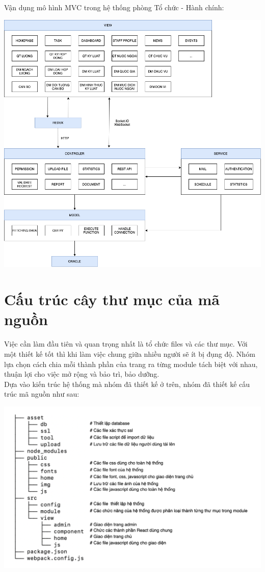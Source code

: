 Vận dụng mô hình MVC trong hệ thống phòng Tổ chức - Hành chính:
\begin{center}
  \captionsetup{type=figure}
  \includegraphics[width=15cm]{img/MVCInTchc.png}
\end{center}

\section{Cấu trúc cây thư mục của mã nguồn}
Việc cần làm đầu tiên và quan trọng nhất là tổ chức files và các thư mục. Với một thiết kế tốt thì khi làm việc chung giữa nhiều người sẽ ít bị đụng độ. Nhóm lựa chọn cách chia mỗi thành phần của trang ra từng module tách biệt với nhau, thuận lợi cho việc mở rộng và bảo trì, bảo dưỡng.\\

Dựa vào kiến trúc hệ thống mà nhóm đã thiết kế ở trên, nhóm đã thiết kế cấu trúc mã nguồn như sau:
\begin{center}
  \captionsetup{type=figure}
  \includegraphics[width=15cm]{img/tree.png}
\end{center}

